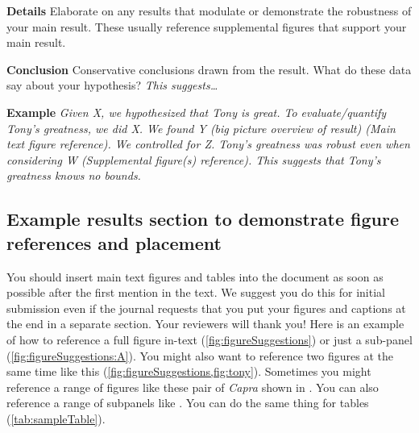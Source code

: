 \noindent\textbf{Details} Elaborate on any results that modulate or demonstrate the robustness of your main result. These usually reference supplemental figures that support your main result.

\noindent\textbf{Conclusion} Conservative conclusions drawn from the result. What do these data say about your hypothesis? \textit{This suggests\dots} 

\bigskip

\noindent\textbf{Example} \textit{Given X, we hypothesized that Tony is great. To evaluate/quantify Tony’s greatness, we did X. We found Y (big picture overview of result) (Main text figure reference). We controlled for Z. Tony’s greatness was robust even when considering W (Supplemental figure(s) reference). This suggests that Tony's greatness knows no bounds.}

\subsection{Example results section to demonstrate figure references and placement}
You should insert main text figures and tables into the document as soon as possible after the first mention in the text. We suggest you do this for initial submission even if the journal requests that you put your figures and captions at the end in a separate section. Your reviewers will thank you! Here is an example of how to reference a full figure in-text (\cref{fig:figureSuggestions}) or just a sub-panel (\cref{fig:figureSuggestions:A}). You might also want to reference two figures at the same time like this (\cref{fig:figureSuggestions,fig:tony}). Sometimes you might reference a range of figures like these pair of \textit{Capra} shown in . You can also reference a range of subpanels like . You can do the same thing for tables (\cref{tab:sampleTable}).

\figureSuggestions

\captionTips